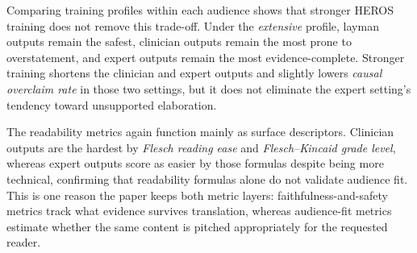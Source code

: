 \documentclass[sigconf]{acmart}
\begin{document}
Comparing training profiles within each audience shows that stronger HEROS training does not remove this trade-off. Under the \emph{extensive} profile, layman outputs remain the safest, clinician outputs remain the most prone to overstatement, and expert outputs remain the most evidence-complete. Stronger training shortens the clinician and expert outputs and slightly lowers \emph{causal overclaim rate} in those two settings, but it does not eliminate the expert setting's tendency toward unsupported elaboration.


The readability metrics again function mainly as surface descriptors. Clinician outputs are the hardest by \emph{Flesch reading ease} and \emph{Flesch--Kincaid grade level}, whereas expert outputs score as easier by those formulas despite being more technical, confirming that readability formulas alone do not validate audience fit. This is one reason the paper keeps both metric layers: faithfulness-and-safety metrics track what evidence survives translation, whereas audience-fit metrics estimate whether the same content is pitched appropriately for the requested reader.
\end{document}
